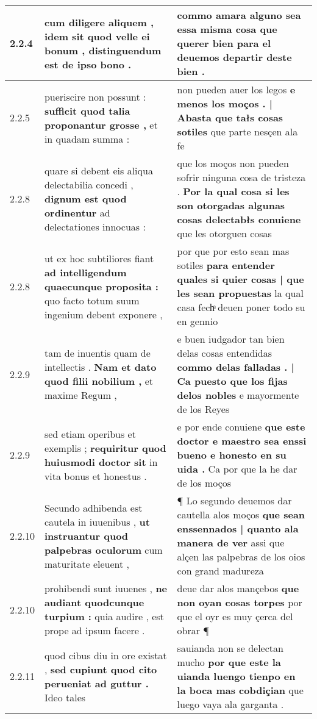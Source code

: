 \begin{tabular}{|p{1cm}|p{6.5cm}|p{6.5cm}|}
2.2.4 & cum diligere aliquem , \textbf{ idem sit quod velle ei bonum , } distinguendum est de ipso bono . & commo amara alguno sea essa misma cosa \textbf{ que querer bien } para el deuemos departir deste bien . \\\hline
2.2.5 & pueriscire non possunt : \textbf{ sufficit quod talia proponantur grosse , } et in quadam summa : & non pueden auer los legos \textbf{ e menos los moços . | Abasta que tałs cosas sotiles } que parte nesçen ala fe \\\hline
2.2.8 & quare si debent eis aliqua delectabilia concedi , \textbf{ dignum est quod ordinentur } ad delectationes innocuas : & que los moços non pueden sofrir ninguna cosa de tristeza . \textbf{ Por la qual cosa si les son otorgadas algunas cosas delectabłs conuiene } que les otorguen cosas \\\hline
2.2.8 & ut ex hoc subtiliores fiant \textbf{ ad intelligendum quaecunque proposita : } quo facto totum suum ingenium debent exponere , & por que por esto sean mas sotiles \textbf{ para entender quales si quier cosas | que les sean propuestas } la qual casa fechͣ deuen poner todo su en gennio \\\hline
2.2.9 & tam de inuentis quam de intellectis . \textbf{ Nam et dato quod filii nobilium , } et maxime Regum , & e buen iudgador tan bien delas cosas entendidas \textbf{ commo delas falladas . | Ca puesto que los fijas delos nobles } e mayormente de los Reyes \\\hline
2.2.9 & sed etiam operibus et exemplis ; \textbf{ requiritur quod huiusmodi doctor sit } in vita bonus et honestus . & e por ende conuiene \textbf{ que este doctor e maestro sea enssi bueno e honesto en su uida . } Ca por que la he dar de los moços \\\hline
2.2.10 & Secundo adhibenda est cautela in iuuenibus , \textbf{ ut instruantur quod palpebras oculorum } cum maturitate eleuent , & ¶ Lo segundo deuemos dar cautella alos moços \textbf{ que sean enssennados | quanto ala manera de ver } assi que alçen las palpebras de los oios con grand madureza \\\hline
2.2.10 & prohibendi sunt iuuenes , \textbf{ ne audiant quodcunque turpium : } quia audire , est prope ad ipsum facere . & deue dar alos mançebos \textbf{ que non oyan cosas torpes } por que el oyr es muy çerca del obrar ¶ \\\hline
2.2.11 & quod cibus diu in ore existat , \textbf{ sed cupiunt quod cito perueniat ad guttur . } Ideo tales & sauianda non se delectan mucho \textbf{ por que este la uianda luengo tienpo en la boca mas cobdiçian } que luego vaya ala garganta . \\\hline

\end{tabular}
